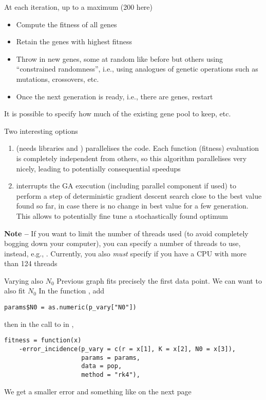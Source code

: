\documentclass[aspectratio=169]{beamer}
\begin{document}
\begin{frame}
At each iteration, up to a maximum  (200 here)
\begin{itemize}
    \item Compute the fitness of all  genes
    \item Retain the genes with highest fitness
    \item Throw in new genes, some at random like before but others using ``constrained randomness'', i.e., using analogues of genetic operations such as mutations, crossovers, etc.
    \item Once the next generation is ready, i.e., there are  genes, restart
\end{itemize}
\vfill
It is possible to specify how much of the existing gene pool to keep, etc.
\end{frame}

\begin{frame}{Two interesting options}
\begin{enumerate}
    \item {} (needs libraries  and ) parallelises the code. Each function (fitness) evaluation is completely independent from others, so this algorithm parallelises very nicely, leading to potentially consequential speedups
    \item {} interrupts the GA execution (including parallel component if used) to perform a step of deterministic gradient descent search close to the best value found so far, in case there is no change in best value for a few generation. This allows to potentially fine tune a stochastically found optimum
\end{enumerate}
\vfill
\textbf{Note --} If you want to limit the number of threads used (to avoid completely bogging down your computer), you can specify a number of threads to use, instead, e.g., . Currently, you also \emph{must} specify  if you have a CPU with more than 124 threads
\end{frame}



\begin{frame}[fragile]{Varying also $N_0$}
    Previous graph fits precisely the first data point. We can want to also fit $N_0$
    \vfill
    In the function , add
\begin{lstlisting}
params$N0 = as.numeric(p_vary["N0"])
\end{lstlisting}
then in the call to  in ,
\begin{lstlisting}
fitness = function(x)
    -error_incidence(p_vary = c(r = x[1], K = x[2], N0 = x[3]),
                     params = params,
                     data = pop,
                     method = "rk4"),
\end{lstlisting}
We get a smaller error and something like on the next page
\end{frame}
\end{document}
